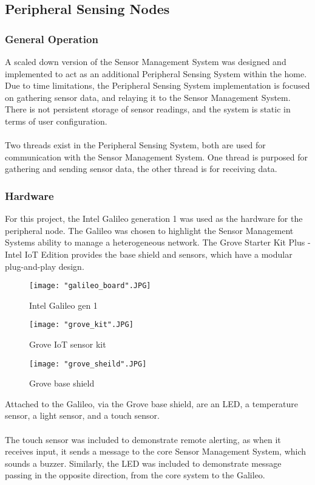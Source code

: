 \documentclass{article}
\begin{document}
\subsection{Peripheral Sensing Nodes}
\subsubsection{General Operation}
A scaled down version of the Sensor Management System was designed and implemented to act as an additional Peripheral Sensing System within the home. Due to time limitations, the Peripheral Sensing System implementation is focused on gathering sensor data, and relaying it to the Sensor Management System. There is not persistent storage of sensor readings, and the system is static in terms of user configuration. \\\\
Two threads exist in the Peripheral Sensing System, both are used for communication with the Sensor Management System. One thread is purposed for gathering and sending sensor data, the other thread is for receiving data. 

\subsubsection{Hardware}
For this project, the Intel Galileo generation 1 was used as the hardware for the peripheral node. The Galileo was chosen to highlight the Sensor Management Systems ability to manage a heterogeneous network. The Grove Starter Kit Plus - Intel IoT Edition provides the base shield and sensors, which have a modular plug-and-play design. 

\begin{figure}[H]
\centering
\texttt{[image: "galileo\_board".JPG]}
\caption{Intel Galileo gen 1}
\label{fig:hard_galileo}
\end{figure}

\begin{figure}[H]
\centering
\texttt{[image: "grove\_kit".JPG]}
\caption{Grove IoT sensor kit}
\label{fig:hard_grove_kit}
\end{figure}

\begin{figure}[H]
\centering
\texttt{[image: "grove\_sheild".JPG]}
\caption{Grove base shield}
\label{fig:hard_grove_sheild}
\end{figure}

\noindent
Attached to the Galileo, via the Grove base shield, are an LED, a temperature sensor, a light sensor, and a touch sensor.\\\\
The touch sensor was included to demonstrate remote alerting, as when it receives input, it sends a message to the core Sensor Management System, which sounds a buzzer. Similarly, the LED was included to demonstrate message passing in the opposite direction, from the core system to the Galileo.
\end{document}
